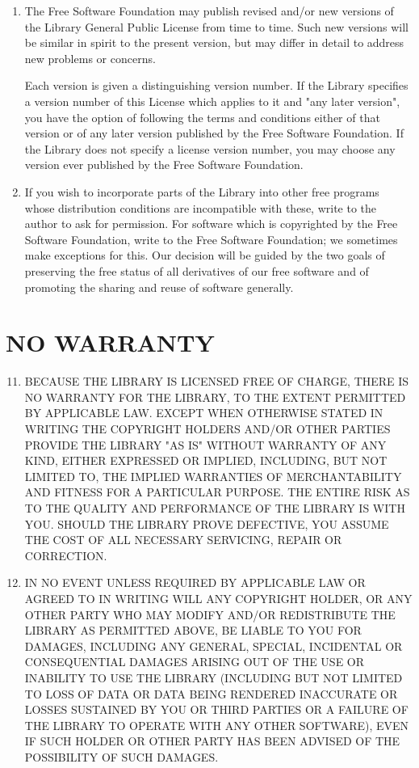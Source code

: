 \begin{enumerate}
\item The Free Software Foundation may publish revised and/or new
versions of the Library General Public License from time to time.
Such new versions will be similar in spirit to the present version,
but may differ in detail to address new problems or concerns.

Each version is given a distinguishing version number.  If the Library
specifies a version number of this License which applies to it and
"any later version", you have the option of following the terms and
conditions either of that version or of any later version published by
the Free Software Foundation.  If the Library does not specify a
license version number, you may choose any version ever published by
the Free Software Foundation.

\item If you wish to incorporate parts of the Library into other free
programs whose distribution conditions are incompatible with these,
write to the author to ask for permission.  For software which is
copyrighted by the Free Software Foundation, write to the Free
Software Foundation; we sometimes make exceptions for this.  Our
decision will be guided by the two goals of preserving the free status
of all derivatives of our free software and of promoting the sharing
and reuse of software generally.
\end{enumerate}

\section*{NO WARRANTY}

\begin{enumerate}
\setcounter{enumi}{10}
\item BECAUSE THE LIBRARY IS LICENSED FREE OF CHARGE, THERE IS NO
WARRANTY FOR THE LIBRARY, TO THE EXTENT PERMITTED BY APPLICABLE LAW\@.
EXCEPT WHEN OTHERWISE STATED IN WRITING THE COPYRIGHT HOLDERS AND/OR
OTHER PARTIES PROVIDE THE LIBRARY "AS IS" WITHOUT WARRANTY OF ANY
KIND, EITHER EXPRESSED OR IMPLIED, INCLUDING, BUT NOT LIMITED TO, THE
IMPLIED WARRANTIES OF MERCHANTABILITY AND FITNESS FOR A PARTICULAR
PURPOSE\@.  THE ENTIRE RISK AS TO THE QUALITY AND PERFORMANCE OF THE
LIBRARY IS WITH YOU\@.  SHOULD THE LIBRARY PROVE DEFECTIVE, YOU ASSUME
THE COST OF ALL NECESSARY SERVICING, REPAIR OR CORRECTION.

\item IN NO EVENT UNLESS REQUIRED BY APPLICABLE LAW OR AGREED TO IN
WRITING WILL ANY COPYRIGHT HOLDER, OR ANY OTHER PARTY WHO MAY MODIFY
AND/OR REDISTRIBUTE THE LIBRARY AS PERMITTED ABOVE, BE LIABLE TO YOU
FOR DAMAGES, INCLUDING ANY GENERAL, SPECIAL, INCIDENTAL OR
CONSEQUENTIAL DAMAGES ARISING OUT OF THE USE OR INABILITY TO USE THE
LIBRARY (INCLUDING BUT NOT LIMITED TO LOSS OF DATA OR DATA BEING
RENDERED INACCURATE OR LOSSES SUSTAINED BY YOU OR THIRD PARTIES OR A
FAILURE OF THE LIBRARY TO OPERATE WITH ANY OTHER SOFTWARE), EVEN IF
SUCH HOLDER OR OTHER PARTY HAS BEEN ADVISED OF THE POSSIBILITY OF SUCH
DAMAGES.
\end{enumerate}

